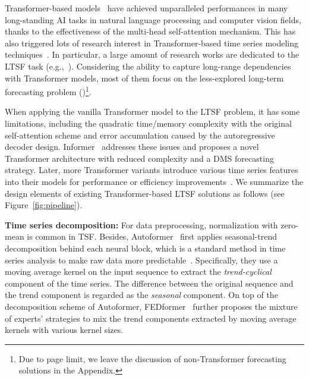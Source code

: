 \documentclass[10pt,twocolumn,letterpaper]{article}
\begin{document}
Transformer-based models~\cite{vaswani2017attention} have achieved unparalleled performances in many long-standing AI tasks in natural language processing and computer vision fields, thanks to the effectiveness of the multi-head self-attention mechanism. This has also triggered lots of research interest in Transformer-based time series modeling techniques~\cite{wen2022transformers,minhao2021t}. In particular, a large amount of research works are dedicated to the LTSF task (e.g.,~\cite{li2019LogTrans,liu2021pyraformer,xu2021autoformer,informer,zhou2022fedformer}). Considering the ability to capture long-range dependencies with Transformer models, most of them focus on the less-explored long-term forecasting problem ()\footnote{Due to page limit, we leave the discussion of non-Transformer forecasting solutions in the Appendix.}. 
 


When applying the vanilla Transformer model to the LTSF problem, it has some limitations, including the quadratic time/memory complexity with the original self-attention scheme and error accumulation caused by the autoregressive decoder design. Informer~\cite{informer} addresses these issues and proposes a novel Transformer architecture with reduced complexity and a DMS forecasting strategy. Later, more Transformer variants 
introduce various time series features into their models for performance or efficiency improvements~\cite{liu2021pyraformer,xu2021autoformer,zhou2022fedformer}. We summarize the design elements of existing Transformer-based LTSF solutions as follows (see Figure~\ref{fig:pipeline}).




\noindent\textbf{Time series decomposition:}
For data preprocessing, normalization with zero-mean is common in TSF. Besides, Autoformer~\cite{xu2021autoformer} first applies seasonal-trend decomposition behind each neural block, which is a standard method in time series analysis to make raw data more predictable~\cite{RBCleveland1990STLA,hamilton2020time}. Specifically, they use a moving average kernel on the input sequence to extract the \emph{trend-cyclical} component of the time series. The difference between the original sequence and the trend component is regarded as the \emph{seasonal} component. 
On top of the decomposition scheme of Autoformer, FEDformer~\cite{zhou2022fedformer} further proposes the mixture of experts' strategies to mix the trend components extracted by moving average kernels with various kernel sizes. 
\end{document}
